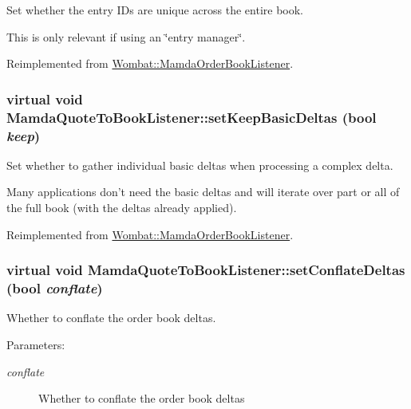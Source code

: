 Set whether the entry IDs are unique across the entire book. 

This is only relevant if using an \char`\"{}entry manager\char`\"{}. 

Reimplemented from \hyperlink{classWombat_1_1MamdaOrderBookListener_4c08ce3aefa0cddb9980a7a8cf043545}{Wombat::Mamda\-Order\-Book\-Listener}.\hypertarget{classMamdaQuoteToBookListener_23babb647b9432258f2e9b36d1813357}{
\subsubsection[setKeepBasicDeltas]{\setlength{\rightskip}{0pt plus 5cm}virtual void Mamda\-Quote\-To\-Book\-Listener::set\-Keep\-Basic\-Deltas (bool {\em keep})}}
\label{classMamdaQuoteToBookListener_23babb647b9432258f2e9b36d1813357}


Set whether to gather individual basic deltas when processing a complex delta. 

Many applications don't need the basic deltas and will iterate over part or all of the full book (with the deltas already applied). 

Reimplemented from \hyperlink{classWombat_1_1MamdaOrderBookListener_393f4acf6e9f87dc8c1de480398d2c6e}{Wombat::Mamda\-Order\-Book\-Listener}.\hypertarget{classMamdaQuoteToBookListener_fc20509b396b145818c6804ad7a72d63}{
\subsubsection[setConflateDeltas]{\setlength{\rightskip}{0pt plus 5cm}virtual void Mamda\-Quote\-To\-Book\-Listener::set\-Conflate\-Deltas (bool {\em conflate})}}
\label{classMamdaQuoteToBookListener_fc20509b396b145818c6804ad7a72d63}


Whether to conflate the order book deltas. 

\begin{Desc}
\item[Parameters:]
\begin{description}
\item[{\em conflate}]Whether to conflate the order book deltas \end{description}
\end{Desc}


